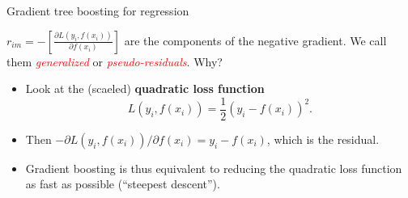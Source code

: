 \documentclass[
  10pt,
  ignorenonframetext,
]{beamer}
\providecommand{\tightlist}{%
  \setlength{\itemsep}{0pt}\setlength{\parskip}{0pt}}
\begin{document}
\begin{frame}
\begin{block}{Gradient tree boosting for regression}
\protect\hypertarget{gradient-tree-boosting-for-regression}{}
\(~\)

\(r_{im} = - \left[ \frac{\partial L(y_i,f(x_i))}{\partial f(x_i)} \right]\)
are the components of the negative gradient. We call them
\emph{\textcolor{red}{generalized}} or
\emph{\textcolor{red}{pseudo-residuals}}. Why?

\vspace{8mm}

\begin{itemize}
\tightlist
\item
  Look at the (scaeled) \textbf{quadratic loss function}
  \[L(y_i,f(x_i)) = \frac{1}{2} (y_i-f(x_i))^2.\]
\end{itemize}

\vspace{2mm}

\begin{itemize}
\tightlist
\item
  Then \(-\partial L(y_i,f(x_i))/\partial f(x_i) = y_i - f(x_i)\), which
  is the residual.
\end{itemize}

\vspace{2mm}

\begin{itemize}
\tightlist
\item
  Gradient boosting is thus equivalent to reducing the quadratic loss
  function as fast as possible (``steepest descent'').
\end{itemize}
\end{block}
\end{frame}
\end{document}
